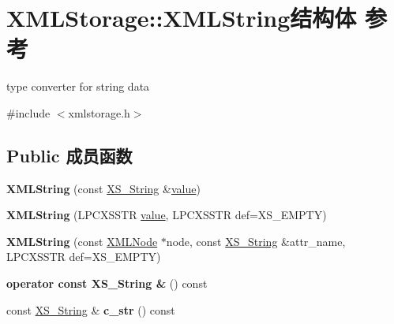 \hypertarget{struct_x_m_l_storage_1_1_x_m_l_string}{}\section{X\+M\+L\+Storage\+:\+:X\+M\+L\+String结构体 参考}
\label{struct_x_m_l_storage_1_1_x_m_l_string}


type converter for string data  




{\ttfamily \#include $<$xmlstorage.\+h$>$}

\subsection*{Public 成员函数}
\begin{DoxyCompactItemize}
\item 
\mbox{\label{struct_x_m_l_storage_1_1_x_m_l_string_a92267cf0f2515950acc9e4495b1d057e}} 
{\bfseries X\+M\+L\+String} (const \hyperlink{struct_x_m_l_storage_1_1_x_s___string}{X\+S\+\_\+\+String} \&\hyperlink{unionvalue}{value})
\item 
\mbox{\label{struct_x_m_l_storage_1_1_x_m_l_string_a6a02d7dc60de95d75d3c088e0f38ee7e}} 
{\bfseries X\+M\+L\+String} (L\+P\+C\+X\+S\+S\+TR \hyperlink{unionvalue}{value}, L\+P\+C\+X\+S\+S\+TR def=X\+S\+\_\+\+E\+M\+P\+TY)
\item 
\mbox{\label{struct_x_m_l_storage_1_1_x_m_l_string_aa0a4ce1f2c200fda8051acba10b2918c}} 
{\bfseries X\+M\+L\+String} (const \hyperlink{struct_x_m_l_storage_1_1_x_m_l_node}{X\+M\+L\+Node} $\ast$node, const \hyperlink{struct_x_m_l_storage_1_1_x_s___string}{X\+S\+\_\+\+String} \&attr\+\_\+name, L\+P\+C\+X\+S\+S\+TR def=X\+S\+\_\+\+E\+M\+P\+TY)
\item 
\mbox{\label{struct_x_m_l_storage_1_1_x_m_l_string_abbba8f713bdb6cfc7ab7dbc62537f46b}} 
{\bfseries operator const X\+S\+\_\+\+String \&} () const
\item 
\mbox{\label{struct_x_m_l_storage_1_1_x_m_l_string_a8546fa35e2d86612339d76eeed0010ff}} 
const \hyperlink{struct_x_m_l_storage_1_1_x_s___string}{X\+S\+\_\+\+String} \& {\bfseries c\+\_\+str} () const
\end{DoxyCompactItemize}
